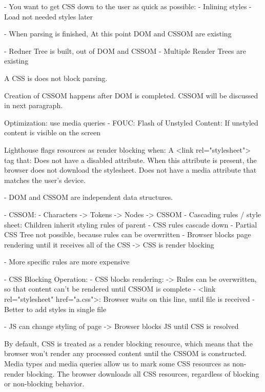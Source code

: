 - You want to get CSS down to the user as quick as possible:
	- Inlining styles
	- Load not needed styles later

- When parsing is finished, At this point DOM and CSSOM are existing

- Redner Tree is built, out of DOM and CSSOM
- Multiple Render Trees are existing


A CSS is does not block parsing. %

Creation of CSSOM happens after DOM is completed. %
CSSOM will be discussed in next paragraph.


Optimization: use media queries
- FOUC: Flash of Unstyled Content: If unstyled content is visible on the screen

Lighthouse flags resources as render blocking when:
A <link rel="stylesheet"> tag that:
Does not have a disabled attribute. When this attribute is present, the browser does not download the stylesheet.
Does not have a media attribute that matches the user's device.



- DOM and CSSOM are independent data structures.

- CSSOM:
	- Characters -> Tokens -> Nodes -> CSSOM
	- Cascading rules / style sheet: Children inherit styling rules of parent
	- CSS rules cascade down
	- Partial CSS Tree not possible, because rules can be overwritten
	- Browser blocks page rendering until it receives all of the CSS
	-> CSS is render blocking

	- More specific rules are more expensive
	
	
- CSS Blocking Operation:
	- CSS blocks rendering:
	-> Rules can be overwritten, so that content can't be rendered until CSSOM is complete
	- <link rel="stylesheet" href="a.css">: Browser waits on this line, until file is received
	- Better to add styles in single file

	- JS can change styling of page -> Browser blocks JS until CSS is resolved
	
	
By default, CSS is treated as a render blocking resource, which means that the browser won't render any processed content until the CSSOM is constructed.
Media types and media queries allow us to mark some CSS resources as non-render blocking.
The browser downloads all CSS resources, regardless of blocking or non-blocking behavior.



